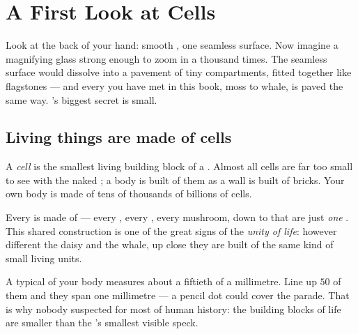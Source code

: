 \chapter{A First Look at Cells}\label{ch:g5:first-look-at-cells}

Look at the back of your hand: smooth , one seamless
surface. Now imagine a magnifying glass strong enough to zoom
in a thousand times. The seamless surface would dissolve into a
pavement of tiny compartments, fitted together like flagstones
--- and every  you have met in this book, moss to
whale, is paved the same way. 's biggest secret is
small.

\section{Living things are made of cells}

\begin{definition}[Cell]\label{def:g5:first-look-at-cells:cell}
A \emph{cell} is the smallest living building block
of a . Almost all cells are far too small to see
with the naked ; a body is built of them as a wall is built
of bricks. Your own body is made of tens of thousands of
billions of cells.
\end{definition}

\begin{proposition}\label{prop:g5:first-look-at-cells:principle}
Every  is made of  --- every , every
, every mushroom, down to  that are just
\emph{one} . This shared construction is one of the great
signs of the \emph{unity of life}: however
different the daisy and the whale, up close they are built of
the same kind of small living units.
\end{proposition}
\admitted

\begin{example}\label{ex:g5:first-look-at-cells:small}
A typical  of your body measures about a fiftieth of a
millimetre. Line up $50$ of them and they span one millimetre
--- a pencil dot could cover the parade. That is why nobody
suspected  for most of human history: the building blocks
of life are smaller than the 's smallest visible speck.
\end{example}


